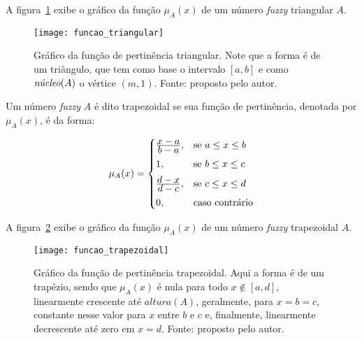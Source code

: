 A figura~\ref{fig:funcao_fuzzy_triangular} exibe o gráfico da função $\mu_A(x)$ de um número \emph{fuzzy} triangular $A$.

\begin{figure}[!h]
  \centering
  \texttt{[image: funcao\_triangular]}
  \caption[Gráfico da função de pertinência triangular]{Gráfico da função de pertinência triangular. Note que a forma é de um triângulo, que tem como base o intervalo $[a, b]$ e como $\emph{núcleo}(A)$ o vértice $(m, 1)$. Fonte: proposto pelo autor.}
  \label{fig:funcao_fuzzy_triangular}
\end{figure}

\begin{defn}
\label{def:funcao_fuzzy_trapezoidal}
Um número \emph{fuzzy} $A$ é dito trapezoidal se sua função de pertinência, denotada por $\mu_{A}(x)$, é da forma:

\begin{equation}
  \mu_A(x) =  \begin{cases}
                \frac{\displaystyle x - a}{\displaystyle b - a}, & \text{se}\ a \leq x \leq b\\[0.5em]
                1, & \text{se}\ b \leq x \leq c\\[0.5em]
                \frac{\displaystyle d - x}{\displaystyle d - c}, & \text{se}\ c \leq x \leq d\\[0.5em]
                0, & \text{caso contrário}
              \end{cases}
\end{equation}
\end{defn}

A figura~\ref{fig:funcao_fuzzy_trapezoidal} exibe o gráfico da função $\mu_A(x)$ de um número \emph{fuzzy} trapezoidal $A$.

\begin{figure}[!h]
  \centering
  \texttt{[image: funcao\_trapezoidal]}
  \caption[Gráfico da função de pertinência trapezoidal]{Gráfico da função de pertinência trapezoidal. Aqui a forma é de um trapézio, sendo que $\mu_A(x)$ é nula para todo $x \notin [a, d]$, linearmente  crescente  até $altura(A)$, geralmente, para $x = b = c$, constante nesse valor para $x$ entre $b$ e $c$ e, finalmente, linearmente decrescente até zero em $x = d$. Fonte: proposto pelo autor.}
  \label{fig:funcao_fuzzy_trapezoidal}
\end{figure}


